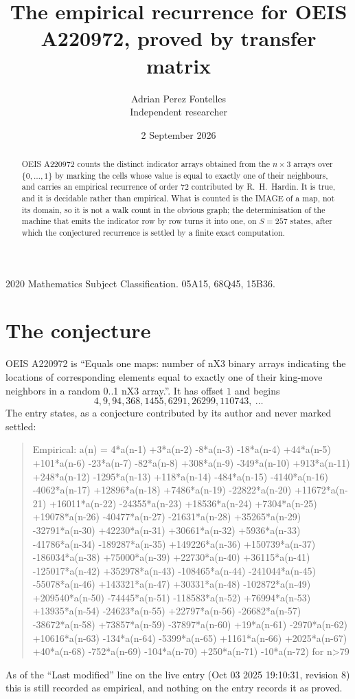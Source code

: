 \documentclass[11pt,a4paper]{article}
\title{The empirical recurrence for OEIS A220972, proved by transfer matrix}
\author{Adrian Perez Fontelles\\ \small Independent researcher}
\date{2 September 2026}
\theoremstyle{plain}
\theoremstyle{definition}
\begin{document}
\maketitle

\begin{abstract}
OEIS A220972 counts the distinct indicator arrays obtained from the $n\times3$ arrays over
$\{0,\dots,1\}$ by marking the cells whose value is equal to exactly one of their neighbours, and carries an
empirical recurrence of order $72$ contributed by R.~H.~Hardin. It is true, and it is
decidable rather than empirical. What is counted is the IMAGE of a map, not its domain, so it
is not a walk count in the obvious graph; the determinisation of the machine that emits the
indicator row by row turns it into one, on $S=257$ states, after which the conjectured
recurrence is settled by a finite exact computation.
\end{abstract}

\noindent\small 2020 Mathematics Subject Classification. 05A15, 68Q45, 15B36.\normalsize

\section{The conjecture}

OEIS A220972 is ``Equals one maps: number of nX3 binary arrays indicating the locations of corresponding elements equal to exactly one of their king-move neighbors in a random 0..1 nX3 array.''. It has offset $1$ and begins
\[
4, 9, 94, 368, 1455, 6291, 26299, 110743,\ \dots
\]
The entry states, as a conjecture contributed by its author and never marked settled:
\begin{quote}
Empirical: a(n) = 4*a(n-1) +3*a(n-2) -8*a(n-3) -18*a(n-4) +44*a(n-5) +101*a(n-6) -23*a(n-7) -82*a(n-8) +308*a(n-9) -349*a(n-10) +913*a(n-11) +248*a(n-12) -1295*a(n-13) +118*a(n-14) -484*a(n-15) -4140*a(n-16) -4062*a(n-17) +12896*a(n-18) +7486*a(n-19) -22822*a(n-20) +11672*a(n-21) +16011*a(n-22) -24355*a(n-23) +18536*a(n-24) +7304*a(n-25) +19078*a(n-26) -40477*a(n-27) -21631*a(n-28) +35265*a(n-29) -32791*a(n-30) +42230*a(n-31) +30661*a(n-32) +5936*a(n-33) -41786*a(n-34) -189287*a(n-35) +149226*a(n-36) +150739*a(n-37) -186034*a(n-38) +75000*a(n-39) +22730*a(n-40) +36115*a(n-41) -125017*a(n-42) +352978*a(n-43) -108465*a(n-44) -241044*a(n-45) -55078*a(n-46) +143321*a(n-47) +30331*a(n-48) -102872*a(n-49) +209540*a(n-50) -74445*a(n-51) -118583*a(n-52) +76994*a(n-53) +13935*a(n-54) -24623*a(n-55) +22797*a(n-56) -26682*a(n-57) -38672*a(n-58) +73857*a(n-59) -37897*a(n-60) +19*a(n-61) -2970*a(n-62) +10616*a(n-63) -134*a(n-64) -5399*a(n-65) +1161*a(n-66) +2025*a(n-67) +40*a(n-68) -752*a(n-69) -104*a(n-70) +250*a(n-71) -10*a(n-72) for n>79
\end{quote}
As of the ``Last modified'' line on the live entry (Oct 03 2025 19:10:31, revision 8) this is still
recorded as empirical, and nothing on the entry records it as proved.
\end{document}
